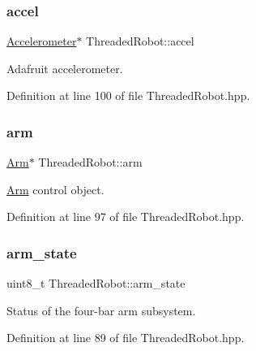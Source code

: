 \subsubsection{\texorpdfstring{accel}{accel}}
{\footnotesize\ttfamily \hyperlink{class_accelerometer}{Accelerometer}$\ast$ Threaded\+Robot\+::accel\hspace{0.3cm}{\ttfamily [private]}}



Adafruit accelerometer. 



Definition at line 100 of file Threaded\+Robot.\+hpp.

\mbox{\label{class_threaded_robot_afc4445eed32ecc9c375e17ccf4f37241}} 
\subsubsection{\texorpdfstring{arm}{arm}}
{\footnotesize\ttfamily \hyperlink{class_arm}{Arm}$\ast$ Threaded\+Robot\+::arm\hspace{0.3cm}{\ttfamily [private]}}



\hyperlink{class_arm}{Arm} control object. 



Definition at line 97 of file Threaded\+Robot.\+hpp.

\mbox{\label{class_threaded_robot_a19026abe96d44213f7e8b3983be2d968}} 
\subsubsection{\texorpdfstring{arm\+\_\+state}{arm\_state}}
{\footnotesize\ttfamily uint8\+\_\+t Threaded\+Robot\+::arm\+\_\+state\hspace{0.3cm}{\ttfamily [private]}}



Status of the four-\/bar arm subsystem. 



Definition at line 89 of file Threaded\+Robot.\+hpp.

\mbox{\label{class_threaded_robot_a77a621d5f607ff296ceac51c831a3258}} 
